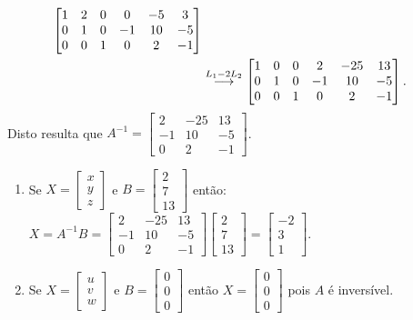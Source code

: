 \documentclass[12pt,a4paper]{article}
\newcommand{\grstep}[2][\relax]{%
   \ensuremath{\mathrel{
       {\mathop{\longrightarrow}\limits^{#2\mathstrut}_{
                                     \begin{subarray}{l} #1 \end{subarray}}}}}}
\begin{document}
\begin{enumerate}
\begin{align*}
\begin{bmatrix}
1 & 2 & 0 & 0 & -5 & 3\\
0 & 1 & 0 & -1 & 10 & -5\\
0 & 0 & 1 & 0 & 2 & -1
\end{bmatrix} \\
&
\grstep{ L_1-2L_2 }
\begin{bmatrix}
1 & 0 & 0 & 2 & -25 & 13\\
0 & 1 & 0 & -1 & 10 & -5\\
0 & 0 & 1 & 0 & 2 & -1
\end{bmatrix}.
\end{align*}
Disto resulta que $A^{-1} = \begin{bmatrix}
 2 & -25 & 13\\
-1 &  10 & -5\\
 0 & 2 & -1
\end{bmatrix}$.

\begin{enumerate}
\item Se $X = \begin{bmatrix}
x\\
y\\
z
\end{bmatrix}$ e $B = \begin{bmatrix}
2\\
7\\
13
\end{bmatrix}$ então:
$
X
= A^{-1} B
=
\begin{bmatrix}
 2 & -25 & 13\\
-1 &  10 & -5\\
 0 & 2 & -1
\end{bmatrix}
\begin{bmatrix}
2\\
7\\
13
\end{bmatrix}
=
\begin{bmatrix}
-2\\
3\\
1
\end{bmatrix}.
$

\item Se $X = \begin{bmatrix}
u\\
v\\
w
\end{bmatrix}$ e $B = \begin{bmatrix}
0\\
0\\
0
\end{bmatrix}$ então $X = \begin{bmatrix}
0\\
0\\
0
\end{bmatrix}$ pois $A$ é inversível.


\end{enumerate}
\end{enumerate}
\end{document}
